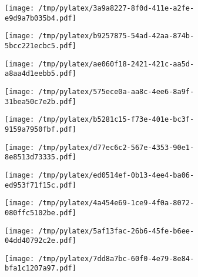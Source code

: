 \documentclass{article}
\begin{document}
\begin{figure}[htbp]
\begin{subfigure}[b]{.3\linewidth}
\texttt{[image: /tmp/pylatex/3a9a8227-8f0d-411e-a2fe-e9d9a7b035b4.pdf]}
\end{subfigure}
\begin{subfigure}[b]{.3\linewidth}
\texttt{[image: /tmp/pylatex/b9257875-54ad-42aa-874b-5bcc221ecbc5.pdf]}
\end{subfigure}
\begin{subfigure}[b]{.3\linewidth}
\texttt{[image: /tmp/pylatex/ae060f18-2421-421c-aa5d-a8aa4d1eebb5.pdf]}
\end{subfigure}
\begin{subfigure}[b]{.3\linewidth}
\texttt{[image: /tmp/pylatex/575ece0a-aa8c-4ee6-8a9f-31bea50c7e2b.pdf]}
\end{subfigure}
\begin{subfigure}[b]{.3\linewidth}
\texttt{[image: /tmp/pylatex/b5281c15-f73e-401e-bc3f-9159a7950fbf.pdf]}
\end{subfigure}
\begin{subfigure}[b]{.3\linewidth}
\texttt{[image: /tmp/pylatex/d77ec6c2-567e-4353-90e1-8e8513d73335.pdf]}
\end{subfigure}
\begin{subfigure}[b]{.3\linewidth}
\texttt{[image: /tmp/pylatex/ed0514ef-0b13-4ee4-ba06-ed953f71f15c.pdf]}
\end{subfigure}
\begin{subfigure}[b]{.3\linewidth}
\texttt{[image: /tmp/pylatex/4a454e69-1ce9-4f0a-8072-080ffc5102be.pdf]}
\end{subfigure}
\begin{subfigure}[b]{.3\linewidth}
\texttt{[image: /tmp/pylatex/5af13fac-26b6-45fe-b6ee-04dd40792c2e.pdf]}
\end{subfigure}
\begin{subfigure}[b]{.3\linewidth}
\texttt{[image: /tmp/pylatex/7dd8a7bc-60f0-4e79-8e84-bfa1c1207a97.pdf]}
\end{subfigure}
\end{figure}
\end{document}
